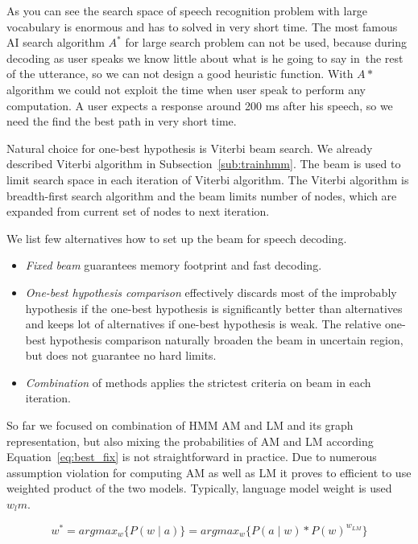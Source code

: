 {As you can see the search space of speech recognition problem with 
large vocabulary is enormous and has to solved in very short time.
The most famous \ac{AI} search algorithm $A^*$ for large search problem can not be used,
because during decoding as user speaks we know little about what is he going to say in~the 
rest of the utterance, so we can not design a good heuristic function.
With $A*$ algorithm we could not exploit the time when user speak
to perform any computation. A user expects a response around 200 ms after his speech, 
so we need the find the best path in very short time.

Natural choice for one-best hypothesis is Viterbi beam search.\cite{huang2001spoken}
We already described Viterbi algorithm in Subsection~\ref{sub:trainhmm}.
The beam is used to limit search space in each iteration of Viterbi algorithm.
The Viterbi algorithm is breadth-first search algorithm and the beam limits 
number of nodes, which are expanded from current set of nodes to next iteration.


We list few alternatives how to set up the beam for speech decoding.
\begin{itemize}
    \item {\it Fixed beam} guarantees memory footprint and fast decoding.
    \item {\it One-best hypothesis comparison} effectively discards 
        most of the improbably hypothesis if the one-best hypothesis is significantly better than alternatives
        and keeps lot of alternatives if one-best hypothesis is weak.
        The relative one-best hypothesis comparison naturally broaden the beam in uncertain region,
        but does not guarantee no hard limits.
    \item {\it Combination} of methods applies the strictest criteria on beam in each iteration.
\end{itemize}


So far we focused on combination of \ac{HMM} \ac{AM} and \ac{LM} and its graph representation,
but also mixing the probabilities of \ac{AM} and \ac{LM} according Equation~\ref{eq:best_fix}
is not straightforward in practice. Due to numerous assumption violation for computing 
\ac{AM} as well as \ac{LM} it proves to efficient to use weighted product of the two models.
Typically, language model weight is used $w_lm$.

\begin{equation}\label{eq:am_lm}
    w^* = argmax_{w}\{P(w \mid a)\} = argmax_{w}\{P(a \mid w) * P(w)^{w_{LM}}\}
\end{equation}

}
